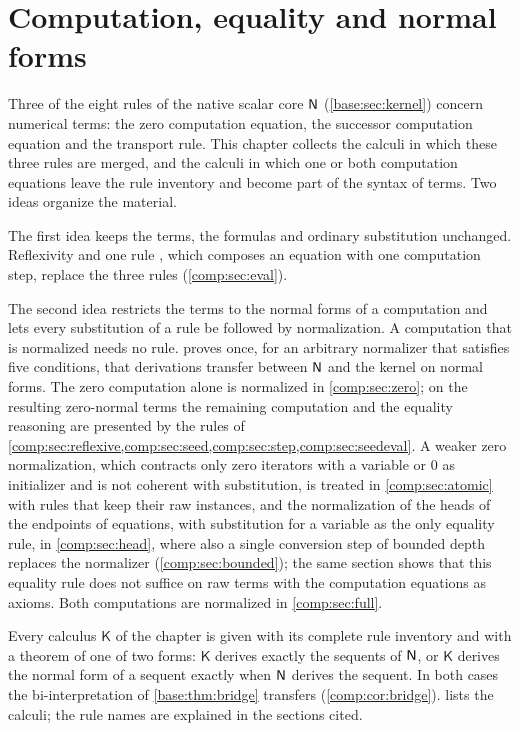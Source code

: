 \chapter{Computation, equality and normal forms}
\label{prov:ch:comp}
\label{comp:ch}

Three of the eight rules of the native scalar core $\mathsf{N}$
(\cref{base:sec:kernel}) concern numerical terms: the zero computation
equation, the successor computation equation and the transport rule. This
chapter collects the calculi in which these three rules are merged, and the
calculi in which one or both computation equations leave the rule inventory
and become part of the syntax of terms. Two ideas organize the material.

The first idea keeps the terms, the formulas and ordinary substitution
unchanged. Reflexivity and one rule , which composes an
equation with one computation step, replace the three rules
(\cref{comp:sec:eval}).

The second idea restricts the terms to the normal forms of a computation and
lets every substitution of a rule be followed by normalization. A
computation that is normalized needs no rule. 
proves once, for an arbitrary normalizer that satisfies five conditions, that
derivations transfer between $\mathsf{N}$ and the kernel on normal forms. The zero
computation alone is normalized in \cref{comp:sec:zero}; on the resulting
zero-normal terms the remaining computation and the equality reasoning are
presented by the rules of
\cref{comp:sec:reflexive,comp:sec:seed,comp:sec:step,comp:sec:seedeval}.
A weaker zero normalization, which contracts only zero iterators with a
variable or $0$ as initializer and is not coherent with substitution, is
treated in \cref{comp:sec:atomic} with rules that keep their raw instances,
and the normalization of the heads of the endpoints of equations, with
substitution for a variable as the only equality rule, in
\cref{comp:sec:head}, where also a single conversion step of bounded depth
replaces the normalizer (\cref{comp:sec:bounded}); the same section shows
that this equality rule does not suffice on raw terms with the computation
equations as axioms.
Both computations are normalized in \cref{comp:sec:full}.

Every calculus $\mathsf{K}$ of the chapter is given with its complete rule
inventory and with a theorem of one of two forms: $\mathsf{K}$ derives
exactly the sequents of $\mathsf{N}$, or $\mathsf{K}$ derives the normal form of a
sequent exactly when $\mathsf{N}$ derives the sequent. In both cases the
bi-interpretation of \cref{base:thm:bridge} transfers
(\cref{comp:cor:bridge}).  lists the calculi; the
rule names are explained in the sections cited.

